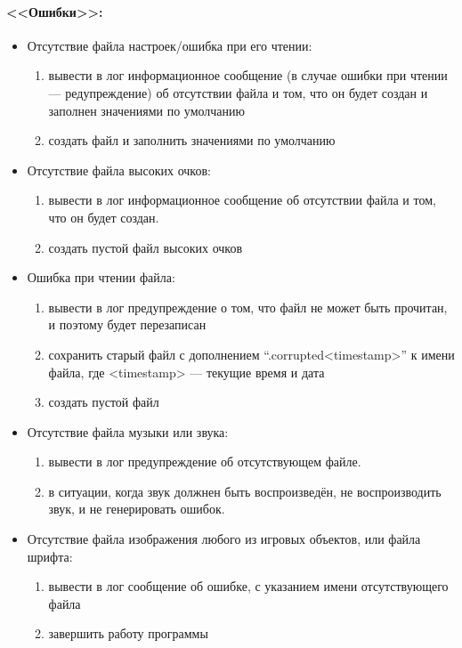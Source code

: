 \documentclass[12pt,a4paper,fullpage,titlepage]{article}
\begin{document}
\paragraph{<<Ошибки>>:}
\begin{itemize}
	\item Отсутствие файла настроек/ошибка при его чтении:
	\begin{enumerate}
		\item вывести в лог информационное сообщение (в случае ошибки при чтении --- редупреждение) об отсутствии файла и том, что он будет создан и заполнен значениями по умолчанию
		\item создать файл и заполнить значениями по умолчанию
	\end{enumerate}
	\item Отсутствие файла высоких очков:
	\begin{enumerate}
		\item вывести в лог информационное сообщение об отсутствии файла и том, что он будет создан.
		\item создать пустой файл высоких очков
	\end{enumerate}
	\item Ошибка при чтении файла:
	\begin{enumerate}
		\item вывести в лог предупреждение о том, что файл не может быть прочитан, и поэтому будет перезаписан
		\item сохранить старый файл с дополнением ``.corrupted<timestamp>'' к имени файла, где <timestamp> --- текущие время и дата
		\item создать пустой файл
	\end{enumerate}
	\item Отсутствие файла музыки или звука:
	\begin{enumerate}
		\item вывести в лог предупреждение об отсутствующем файле.
		\item в ситуации, когда звук должнен быть воспроизведён, не воспроизводить звук, и не генерировать ошибок.
	\end{enumerate}
	\item Отсутствие файла изображения любого из игровых объектов, или файла шрифта:
	\begin{enumerate}
		\item вывести в лог сообщение об ошибке, с указанием имени отсутствующего файла
		\item завершить работу программы
	\end{enumerate}
\end{itemize}
\end{document}
